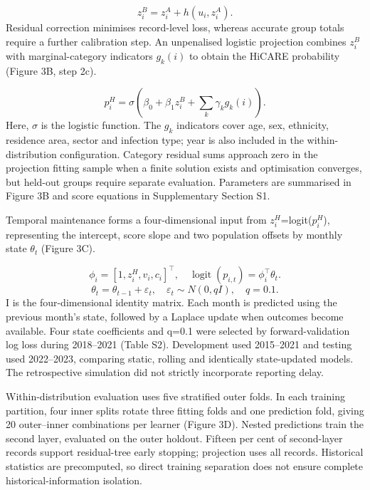 \documentclass[11pt,a4paper]{article}
\begin{document}
\begin{equation}
z_i^B=z_i^A+h(u_i,z_i^A).
\end{equation}
Residual correction minimises record-level loss, whereas accurate group totals require a further calibration step. An unpenalised logistic projection combines $z_i^B$ with marginal-category indicators $g_k(i)$ to obtain the HiCARE probability (Figure 3B, step 2c).

\begin{equation}
p_i^H=\sigma\!\left(\beta_0+\beta_1z_i^B+\sum_k\gamma_kg_k(i)\right).
\end{equation}
Here, $\sigma$ is the logistic function. The $g_k$ indicators cover age, sex, ethnicity, residence area, sector and infection type; year is also included in the within-distribution configuration. Category residual sums approach zero in the projection fitting sample when a finite solution exists and optimisation converges, but held-out groups require separate evaluation. Parameters are summarised in Figure 3B and score equations in Supplementary Section S1.

Temporal maintenance forms a four-dimensional input from $z_i^H$=logit($p_i^H$), representing the intercept, score slope and two population offsets by monthly state $\theta_t$ (Figure 3C).

\begin{equation}
\phi_i=[1,z_i^H,v_i,c_i]^\top,\quad \operatorname{logit}(p_{i,t})=\phi_i^\top\theta_t.
\end{equation}
\begin{equation}
\theta_t=\theta_{t-1}+\varepsilon_t,\quad \varepsilon_t\sim N(0,qI),\quad q=0.1.
\end{equation}
I is the four-dimensional identity matrix. Each month is predicted using the previous month's state, followed by a Laplace update when outcomes become available. Four state coefficients and q=0.1 were selected by forward-validation log loss during 2018–2021 (Table S2). Development used 2015–2021 and testing used 2022–2023, comparing static, rolling and identically state-updated models. The retrospective simulation did not strictly incorporate reporting delay.

Within-distribution evaluation uses five stratified outer folds. In each training partition, four inner splits rotate three fitting folds and one prediction fold, giving 20 outer–inner combinations per learner (Figure 3D). Nested predictions train the second layer, evaluated on the outer holdout. Fifteen per cent of second-layer records support residual-tree early stopping; projection uses all records. Historical statistics are precomputed, so direct training separation does not ensure complete historical-information isolation.
\end{document}
